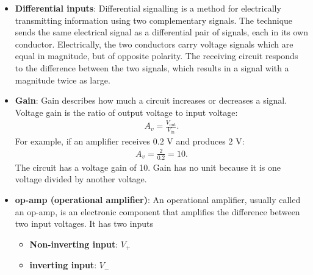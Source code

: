 \documentclass{report}
\begin{document}
\begin{itemize}
            \begin{align*}
                V_{\text{in}} = V_{1} + V_{2} + V_{3}
            .\end{align*}
            So,
            \begin{align*}
                V_{\text{in}} = IR_{1} + IR_{2} + IR_{3} = I(R_{1} + R_{2} + R_{3})
            .\end{align*}
            Thus, 
            \begin{align*}
                I = \frac{V_{\text{in}}}{\sum_{i}R_{i}}
            .\end{align*}
        \item \textbf{Differential inputs}: Differential signalling is a method for electrically transmitting information using two complementary signals. The technique sends the same electrical signal as a differential pair of signals, each in its own conductor.
            \bigbreak \noindent 
            Electrically, the two conductors carry voltage signals which are equal in magnitude, but of opposite polarity. The receiving circuit responds to the difference between the two signals, which results in a signal with a magnitude twice as large.
        \item \textbf{Gain}: Gain describes how much a circuit increases or decreases a signal. Voltage gain is the ratio of output voltage to input voltage:
            \begin{align*}
                A_{v} = \frac{V_{\text{out}}}{V_{\text{in}}}
            .\end{align*}
            For example, if an amplifier receives \(0.2\text{ V}\) and produces \(2\text{ V}\):
            \begin{align*}
                A_{v} = \frac{2}{0.2} = 10
            .\end{align*} 
            The circuit has a voltage gain of 10.
            \bigbreak \noindent 
            Gain has no unit because it is one voltage divided by another voltage.
        \item \textbf{op-amp (operational amplifier)}:  An operational amplifier, usually called an op-amp, is an electronic component that amplifies the difference between two input voltages.
            \bigbreak \noindent 
            It has two inputs
            \begin{itemize}
                \item \textbf{Non-inverting input}: $V_{+}$
                \item \textbf{inverting input}: $V_{-}$

\end{itemize}
\end{itemize}
\end{document}
